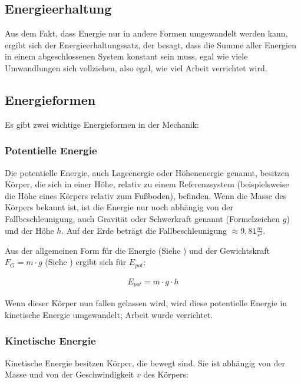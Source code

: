 \subsection{Energieerhaltung}

Aus dem Fakt, dass Energie nur in andere Formen umgewandelt werden kann, ergibt sich der Energieerhaltungssatz, der besagt, dass die Summe aller Energien in einem abgeschlossenen System konstant sein muss, egal wie viele Umwandlungen sich vollziehen, also egal, wie viel Arbeit verrichtet wird. 


\subsection{Energieformen}	\label{subsec:Energieformen}

Es gibt zwei wichtige Energieformen in der Mechanik:

\subsubsection{Potentielle Energie}

Die potentielle Energie, auch Lageenergie oder Höhenenergie genannt, besitzen Körper, die sich in einer Höhe, relativ zu einem Referenzsystem (beispielsweise die Höhe eines Körpers relativ zum Fußboden), befinden. Wenn die Masse des Körpers bekannt ist, ist die Energie nur noch abhängig von der Fallbeschleunigung, auch Gravität oder Schwerkraft genannt (Formelzeichen $g$) und der Höhe $h$. Auf der Erde beträgt die Fallbeschleunigung $\approx 9,81 \frac{m}{s^2}$.

Aus der allgemeinen Form für die Energie (Siehe ) und der Gewichtskraft $F_G = m \cdot g$ (Siehe ) ergibt sich für $E_{pot}$:

\begin{align} \label{eq:epot}
	E_{pot} = m \cdot g \cdot h
\end{align}

\noindent Wenn dieser Körper nun fallen gelassen wird, wird diese potentielle Energie in kinetische Energie umgewandelt; Arbeit wurde verrichtet.

\subsubsection{Kinetische Energie}

Kinetische Energie besitzen Körper, die bewegt sind. Sie ist abhängig von der Masse und von der Geschwindigkeit $v$ des Körpers:

